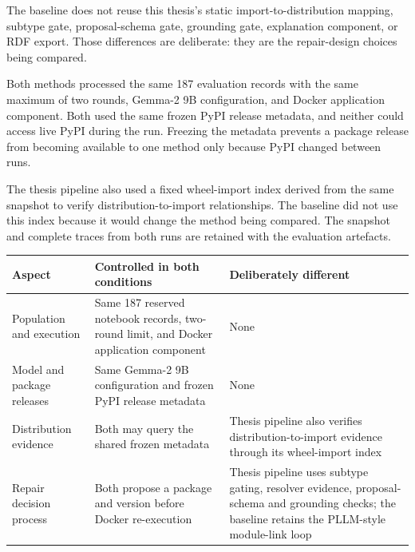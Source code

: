 The baseline does not reuse this thesis's static import-to-distribution mapping,
subtype gate, proposal-schema gate, grounding gate, explanation component, or
RDF export. Those differences are deliberate: they are the repair-design
choices being compared.

Both methods processed the same 187 evaluation records with the same
maximum of two rounds, Gemma-2 9B configuration, and Docker application
component. Both used the same frozen PyPI release metadata, and neither could
access live PyPI during the run. Freezing the metadata prevents a package
release from becoming available to one method only because PyPI changed between
runs.

The thesis pipeline also used a fixed wheel-import index derived from the same
snapshot to verify distribution-to-import relationships. The baseline did not
use this index because it would change the method being compared. The snapshot
and complete traces from both runs are retained with the evaluation artefacts.

{\footnotesize
  \setlength{\tabcolsep}{3pt}
  \begin{center}
  \begin{tabular}{|p{3.0cm}|p{4.3cm}|p{3.7cm}|}
    \hline
    \textbf{Aspect} & \textbf{Controlled in both conditions} & \textbf{Deliberately different} \\
    \hline
    Population and execution & Same 187 reserved notebook records, two-round limit, and Docker application component & None \\
    \hline
    Model and package releases & Same Gemma-2 9B configuration and frozen PyPI release metadata & None \\
    \hline
    Distribution evidence & Both may query the shared frozen metadata & Thesis pipeline also verifies distribution-to-import evidence through its wheel-import index \\
    \hline
    Repair decision process & Both propose a package and version before Docker re-execution & Thesis pipeline uses subtype gating, resolver evidence, proposal-schema and grounding checks; the baseline retains the PLLM-style module-link loop \\
    \hline
  \end{tabular}
  \label{tab:v-pllm-comparability}
  \end{center}
}

